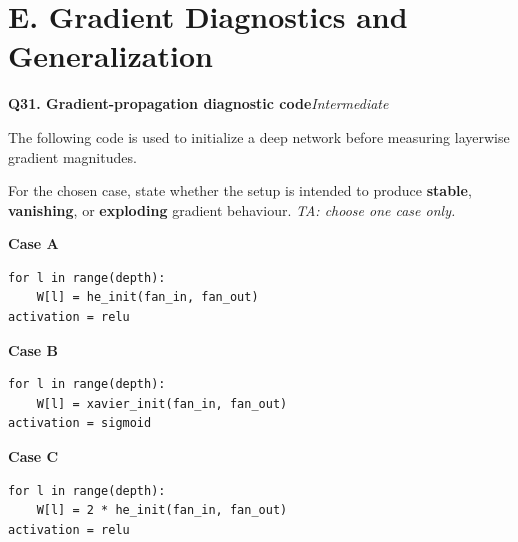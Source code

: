 \documentclass[11pt]{article}
\newif\ifshowanswers
\newenvironment{question}[3]{%
  \par\medskip
  \noindent\textbf{Q#1. #2}\hfill\textit{#3}\par\smallskip
}{\par\medskip}
\newcommand{\answer}[1]{%
  \ifshowanswers
    \begin{quote}\small\textbf{Expected answer:} #1\end{quote}
  \fi
}
\newcommand{\marking}[1]{%
  \ifshowanswers
    \begin{quote}\small\textbf{1 mark:} #1\end{quote}
  \fi
}
\newcommand{\casesnote}{\textit{TA: choose one case only.}}
\begin{document}
\section*{E. Gradient Diagnostics and Generalization}

\begin{question}{31}{Gradient-propagation diagnostic code}{Intermediate}
The following code is used to initialize a deep network before measuring
layerwise gradient magnitudes.

For the chosen case, state whether the setup is intended to produce
\textbf{stable}, \textbf{vanishing}, or \textbf{exploding} gradient behaviour.
\casesnote

\textbf{Case A}
\begin{verbatim}
for l in range(depth):
    W[l] = he_init(fan_in, fan_out)
activation = relu
\end{verbatim}

\textbf{Case B}
\begin{verbatim}
for l in range(depth):
    W[l] = xavier_init(fan_in, fan_out)
activation = sigmoid
\end{verbatim}

\textbf{Case C}
\begin{verbatim}
for l in range(depth):
    W[l] = 2 * he_init(fan_in, fan_out)
activation = relu
\end{verbatim}

\answer{
Case A: Stable reference. ReLU with He initialization is intended to maintain
reasonable activation and gradient magnitudes through depth.

Case B: Vanishing-gradient condition. Repeated sigmoid derivatives can reduce
the gradient as it propagates through many layers.

Case C: Exploding-gradient condition. Doubling the He-initialized weights
amplifies signals repeatedly through the deep network and is intended to
produce growing gradients.
}

\marking{Student correctly identifies the intended gradient behaviour for the
chosen code and gives the relevant reason.}
\end{question}
\end{document}
